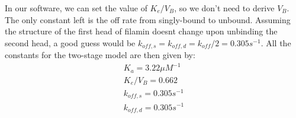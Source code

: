 \documentclass{article}[12pt]
\begin{document}
In our software, we can set the value of $K_e / V_B$, so we don't need to derive $V_B$. The only constant left is the off rate from singly-bound to unbound. Assuming the structure of the first head of filamin doesnt change upon unbinding the second head, a good guess would be $k_{off,s} = k_{off,d} = k_{off}/2 = 0.305 s^{-1}$. All the constants for the two-stage model are then given by:
\begin{align*}
	K_a = 3.22 \mu M^{-1} \\
	K_e/V_B = 0.662\\
	k_{off,s} = 0.305 s^{-1}\\
	k_{off,d} = 0.305 s^{-1}
\end{align*}
\\



\medskip



\end{document}
